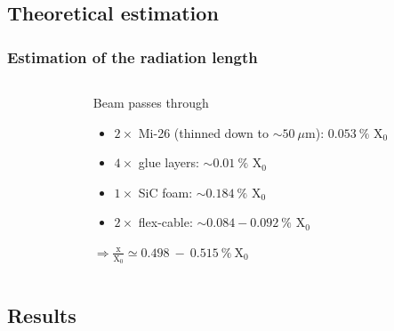 \documentclass{beamer}
\begin{document}
    \subsection{Theoretical estimation}
    
    \begin{frame}
      \frametitle{Estimation of the radiation length}

      \begin{columns}[t]
        \begin{column}{5cm}
        \end{column}
        \begin{column}{5cm}
          \begin{block}{Beam passes through}
            \begin{itemize}
              \item $2 \times$ Mi-26 (thinned down to $\sim 50~\mu$m): $0.053~\%$ X$_0$
              \item $4 \times$ glue layers: $\sim 0.01~\%$ X$_0$
              \item $1 \times$ SiC foam: $\sim 0.184~\%$ X$_0$
              \item $2 \times$ flex-cable: $\sim 0.084 - 0.092~\%$ X$_0$
            \end{itemize}
            $\Rightarrow \frac{\text{x}}{\text{X}_0} \simeq 0.498~-~0.515~\%~\text{X}_0$
          \end{block}
        \end{column}
      \end{columns}
    \end{frame}

    \subsection{Results}
\end{document}
